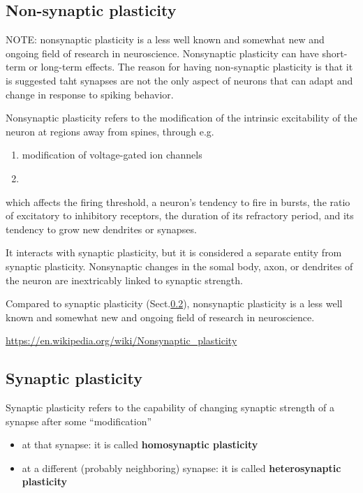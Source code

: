 \subsection{Non-synaptic plasticity}
\label{sec:nonsynaptic-plasticity}

NOTE: nonsynaptic plasticity is a less well known and somewhat new and ongoing
field of research in neuroscience. Nonsynaptic plasticity can have short-term
or long-term effects. The reason for having non-synaptic plasticity is that
it is suggested taht synapses are not the only aspect of neurons that can adapt
and change in response to spiking behavior.
  
Nonsynaptic plasticity refers to the modification of the intrinsic
excitability of the neuron at regions away from spines, through e.g.
\begin{enumerate}
  \item modification of voltage-gated ion channels


  
  \item
\end{enumerate}  
which affects the firing threshold, a neuron's tendency to fire in bursts, the
ratio of excitatory to inhibitory receptors, the duration of its refractory
period, and its tendency to grow new dendrites or synapses.

It interacts with synaptic plasticity, but it is considered a separate
entity from synaptic plasticity.
Nonsynaptic changes in the somal body, axon, or dendrites of the neuron are
inextricably linked to synaptic strength.

Compared to synaptic plasticity (Sect.\ref{sec:synaptic_plasticity}),
nonsynaptic plasticity is a less well known and somewhat new and ongoing field
of research in neuroscience.

\url{https://en.wikipedia.org/wiki/Nonsynaptic_plasticity}

\subsection{Synaptic plasticity}
\label{sec:synaptic_plasticity}

Synaptic plasticity refers to the capability of changing synaptic strength of a
synapse after some ``modification''
\begin{itemize}
  \item at that synapse: it is called {\bf homosynaptic plasticity}
  \item at a different (probably neighboring) synapse: it is called {\bf
  heterosynaptic plasticity}
\end{itemize}

